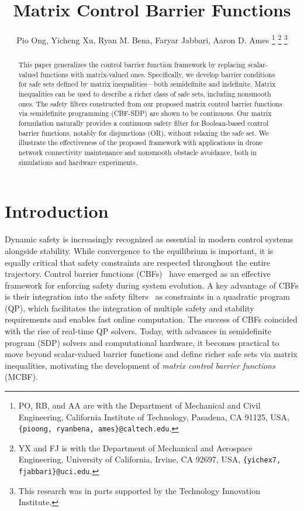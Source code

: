 \documentclass[10pt,twocolumn,twoside]{IEEEtran}
\title{\LARGE \textbf{Matrix Control Barrier Functions}}
\author{Pio Ong, Yicheng Xu, Ryan M. Bena, Faryar Jabbari, Aaron D. Ames %
\thanks{PO, RB, and AA are with the Department of Mechanical and Civil Engineering, California Institute of Technology, Pasadena, CA 91125, USA, \texttt{\{pioong, ryanbena, ames\}@caltech.edu}.}
\thanks{YX and FJ is with the Department of Mechanical and Aerospace Engineering, University of California, Irvine, CA 92697, USA, \texttt{\{yichex7, fjabbari\}@uci.edu}.}
\thanks{This research was in parts supported by the Technology Innovation Institute.}
}
\theoremstyle{definition}
\begin{document}
\maketitle
\begin{abstract}
    This paper generalizes the control barrier function framework by replacing scalar-valued functions with matrix-valued ones. Specifically, we develop barrier conditions for safe sets defined by matrix inequalities---both semidefinite and indefinite. Matrix inequalities can be used to describe a richer class of safe sets, including nonsmooth ones.   The safety filters constructed from our proposed matrix control barrier functions via semidefinite programming (CBF-SDP) are shown to be continuous. Our matrix formulation naturally provides a continuous safety filter for Boolean-based control barrier functions, notably for disjunctions (OR), without relaxing the safe set. We illustrate the effectiveness of the proposed framework with applications in drone network connectivity maintenance and nonsmooth obstacle avoidance, both in simulations and hardware experiments.
\end{abstract}
\section{Introduction}
Dynamic safety is increasingly recognized as essential in modern control systems alongside stability. While convergence to the equilibrium is important, it is equally critical that safety constraints are respected throughout the entire trajectory. Control barrier functions (CBFs)~\cite{ADA-SC-ME-GN-KS-PT:19,PW-FA:07} have emerged as an effective framework for enforcing safety during system evolution. A key advantage of CBFs is their integration into the safety filters~\cite{TG-MM-AS-PN-EF-ADA:20} as constraints in a quadratic program (QP), which facilitates the integration of multiple safety and stability requirements and enables fast online computation. The success of CBFs coincided with the rise of real-time QP solvers. Today, with advances in semidefinite program (SDP) solvers and computational hardware, it becomes practical to move beyond scalar-valued barrier functions and define richer safe sets via matrix inequalities, motivating the development of \textit{matrix control barrier functions} (MCBF). 
\end{document}
